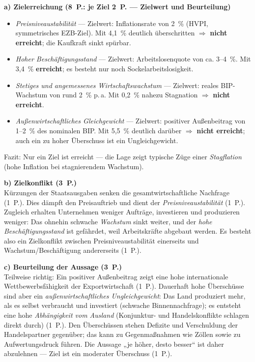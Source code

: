 \begin{loesung}[title={Lösung Aufgabe~2.8 --- Magisches Viereck: Lage beurteilen}]
\textbf{a) Zielerreichung (8~P.: je Ziel 2~P. --- Zielwert und Beurteilung)}
\begin{itemize}
  \item \emph{Preisniveaustabilität} --- Zielwert: Inflationsrate von 2~\% (HVPI,
    symmetrisches EZB-Ziel). Mit 4,1~\% deutlich überschritten $\Rightarrow$
    \textbf{nicht erreicht}; die Kaufkraft sinkt spürbar.
  \item \emph{Hoher Beschäftigungsstand} --- Zielwert: Arbeitslosenquote von ca.
    3--4~\%. Mit 3,4~\% \textbf{erreicht}; es besteht nur noch Sockelarbeitslosigkeit.
  \item \emph{Stetiges und angemessenes Wirtschaftswachstum} --- Zielwert: reales
    BIP-Wachstum von rund 2~\% p.\,a. Mit 0,2~\% nahezu Stagnation $\Rightarrow$
    \textbf{nicht erreicht}.
  \item \emph{Außenwirtschaftliches Gleichgewicht} --- Zielwert: positiver Außenbeitrag
    von 1--2~\% des nominalen BIP. Mit 5,5~\% deutlich darüber $\Rightarrow$
    \textbf{nicht erreicht}; auch ein zu hoher Überschuss ist ein Ungleichgewicht.
\end{itemize}
Fazit: Nur ein Ziel ist erreicht --- die Lage zeigt typische Züge einer
\emph{Stagflation} (hohe Inflation bei stagnierendem Wachstum).

\textbf{b) Zielkonflikt (3~P.)}\\
Kürzungen der Staatsausgaben senken die gesamtwirtschaftliche Nachfrage (1~P.). Dies
dämpft den Preisauftrieb und dient der \emph{Preisniveaustabilität} (1~P.). Zugleich
erhalten Unternehmen weniger Aufträge, investieren und produzieren weniger: Das ohnehin
schwache \emph{Wachstum} sinkt weiter, und der \emph{hohe Beschäftigungsstand} ist
gefährdet, weil Arbeitskräfte abgebaut werden. Es besteht also ein Zielkonflikt zwischen
Preisniveaustabilität einerseits und Wachstum/Beschäftigung andererseits (1~P.).

\textbf{c) Beurteilung der Aussage (3~P.)}\\
Teilweise richtig: Ein positiver Außenbeitrag zeigt eine hohe internationale
Wettbewerbsfähigkeit der Exportwirtschaft (1~P.). Dauerhaft hohe Überschüsse sind aber
ein \emph{außenwirtschaftliches Ungleichgewicht}: Das Land produziert mehr, als es
selbst verbraucht und investiert (schwache Binnennachfrage); es entsteht eine hohe
\emph{Abhängigkeit vom Ausland} (Konjunktur- und Handelskonflikte schlagen direkt durch)
(1~P.). Den Überschüssen stehen Defizite und Verschuldung der Handelspartner gegenüber;
das kann zu Gegenmaßnahmen wie Zöllen sowie zu Aufwertungsdruck führen. Die Aussage „je
höher, desto besser`` ist daher abzulehnen --- Ziel ist ein moderater Überschuss
(1~P.).
\end{loesung}
